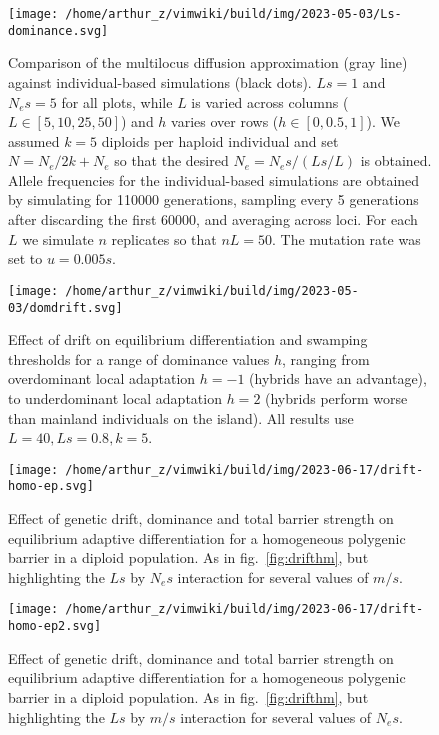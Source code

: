 \documentclass[
  11pt,
]{article}
\begin{document}
\begin{figure}
\hypertarget{fig:Lsdom}{%
\centering
\texttt{[image: /home/arthur\_z/vimwiki/build/img/2023-05-03/Ls-dominance.svg]}
\caption{Comparison of the multilocus diffusion approximation (gray
line) against individual-based simulations (black dots). \(Ls =1\) and
\(N_es = 5\) for all plots, while \(L\) is varied across columns
(\(L\in [5,10,25,50]\)) and \(h\) varies over rows (\(h\in[0,0.5,1]\)).
We assumed \(k=5\) diploids per haploid individual and set
\(N = N_e/2k + N_e\) so that the desired \(N_e = N_es/(Ls/L)\) is
obtained. Allele frequencies for the individual-based simulations are
obtained by simulating for 110000 generations, sampling every 5
generations after discarding the first 60000, and averaging across loci.
For each \(L\) we simulate \(n\) replicates so that \(nL = 50\). The
mutation rate was set to \(u=0.005s\).}\label{fig:Lsdom}
}
\end{figure}

\begin{figure}
\hypertarget{fig:drift}{%
\centering
\texttt{[image: /home/arthur\_z/vimwiki/build/img/2023-05-03/domdrift.svg]}
\caption{Effect of drift on equilibrium differentiation and swamping
thresholds for a range of dominance values \(h\), ranging from
overdominant local adaptation \(h=-1\) (hybrids have an advantage), to
underdominant local adaptation \(h=2\) (hybrids perform worse than
mainland individuals on the island). All results use
\(L=40, Ls=0.8, k=5\).}\label{fig:drift}
}
\end{figure}

\begin{figure}
\hypertarget{fig:drifthm1}{%
\centering
\texttt{[image: /home/arthur\_z/vimwiki/build/img/2023-06-17/drift-homo-ep.svg]}
\caption{Effect of genetic drift, dominance and total barrier strength
on equilibrium adaptive differentiation for a homogeneous polygenic
barrier in a diploid population. As in fig.~\ref{fig:drifthm}, but
highlighting the \(Ls\) by \(N_es\) interaction for several values of
\(m/s\).}\label{fig:drifthm1}
}
\end{figure}

\begin{figure}
\hypertarget{fig:drifthm3}{%
\centering
\texttt{[image: /home/arthur\_z/vimwiki/build/img/2023-06-17/drift-homo-ep2.svg]}
\caption{Effect of genetic drift, dominance and total barrier strength
on equilibrium adaptive differentiation for a homogeneous polygenic
barrier in a diploid population. As in fig.~\ref{fig:drifthm}, but
highlighting the \(Ls\) by \(m/s\) interaction for several values of
\(N_es\).}\label{fig:drifthm3}
}
\end{figure}
\end{document}
